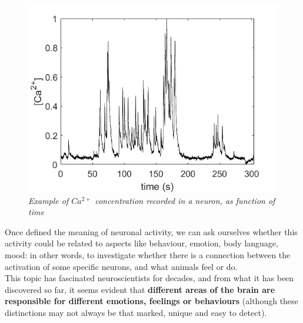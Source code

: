 \documentclass[a4paper]{article}
\begin{document}
\begin{figure}[H]
	\begin{center}
		\includegraphics[scale=.50]{Ca_conc.png} 
	\end{center} 
	\caption{\textit{Example of $Ca^{2+}$ concentration recorded in a neuron, as function of time}}
		
	\end{figure}
	
	Once defined the meaning of neuronal activity, we can ask ourselves whether this activity could be related to aspects like behaviour, emotion, body language, mood: in other words, to investigate whether there is a connection between the activation of some specific neurons, and what animals feel or do.\\
	This topic has fascinated neuroscientists for decades, and from what it has been discovered so far, it seems evident that \textbf{different areas of the brain are responsible for different emotions, feelings or behaviours} (although these distinctions may not always be that marked, unique and easy to detect).
\end{document}
